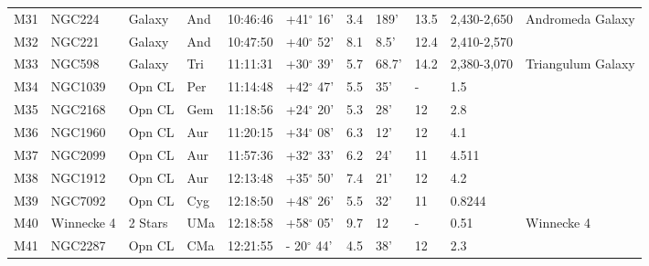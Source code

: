 \begin{longtable}{@{}lllllllllll@{}}
M31        & NGC224      & Galaxy     & And       & 10:46:46 & +41$^{\circ}$ 16'  & 3.4       & 189'                 & 13.5     & 2,430-2,650         & Andromeda Galaxy                          \\
M32        & NGC221      & Galaxy     & And       & 10:47:50 & +40$^{\circ}$ 52'  & 8.1       & 8.5'                 & 12.4     & 2,410-2,570         &                                           \\
M33        & NGC598      & Galaxy     & Tri       & 11:11:31 & +30$^{\circ}$ 39'  & 5.7       & 68.7'                & 14.2     & 2,380-3,070         & Triangulum Galaxy                         \\
M34        & NGC1039     & Opn CL     & Per       & 11:14:48 & +42$^{\circ}$ 47'  & 5.5       & 35'                  & -        & 1.5                 &                                           \\
M35        & NGC2168     & Opn CL     & Gem       & 11:18:56 & +24$^{\circ}$ 20'  & 5.3       & 28'                  & 12       & 2.8                 &                                           \\
M36        & NGC1960     & Opn CL     & Aur       & 11:20:15 & +34$^{\circ}$ 08'  & 6.3       & 12'                  & 12       & 4.1                 &                                           \\
M37        & NGC2099     & Opn CL     & Aur       & 11:57:36 & +32$^{\circ}$ 33'  & 6.2       & 24'                  & 11       & 4.511               &                                           \\
M38        & NGC1912     & Opn CL     & Aur       & 12:13:48 & +35$^{\circ}$ 50'  & 7.4       & 21'                  & 12       & 4.2                 &                                           \\
M39        & NGC7092     & Opn CL     & Cyg       & 12:18:50 & +48$^{\circ}$ 26'  & 5.5       & 32'                  & 11       & 0.8244              &                                           \\
M40        & Winnecke 4  & 2 Stars    & UMa       & 12:18:58 & +58$^{\circ}$ 05'  & 9.7       & 12                   & -        & 0.51                & Winnecke 4                                \\
M41        & NGC2287     & Opn CL     & CMa       & 12:21:55 & - 20$^{\circ}$ 44' & 4.5       & 38'                  & 12       & 2.3                 &                                           \\

\end{longtable}
